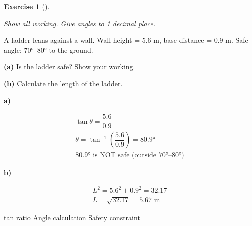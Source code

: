\documentclass[
  letterpaper,
  DIV=11,
  numbers=noendperiod]{scrreprt}
\theoremstyle{definition}
\newtheorem{exercise}{Exercise}[chapter]
\theoremstyle{remark}
\begin{document}
\begin{exercise}[]\protect\hypertarget{exr-trig-24}{}\label{exr-trig-24}

\emph{Show all working. Give angles to 1 decimal place.}

A ladder leans against a wall. Wall height = 5.6 m, base distance = 0.9
m. Safe angle: 70°--80° to the ground.

\textbf{(a)} Is the ladder safe? Show your working.

\textbf{(b)} Calculate the length of the ladder.

\begin{tcolorbox}[enhanced jigsaw, opacitybacktitle=0.6, coltitle=black, arc=.35mm, colframe=quarto-callout-tip-color-frame, colback=white, bottomrule=.15mm, left=2mm, colbacktitle=quarto-callout-tip-color!10!white, titlerule=0mm, opacityback=0, title=\textcolor{quarto-callout-tip-color}{\faLightbulb}\hspace{0.5em}{🔍 View Solution}, leftrule=.75mm, breakable, rightrule=.15mm, bottomtitle=1mm, toptitle=1mm, toprule=.15mm]

\textbf{a)}

\[
\begin{aligned}
\tan\theta = \dfrac{5.6}{0.9} \\ \theta = \tan^{-1}\!\left(\dfrac{5.6}{0.9}\right) = 80.9° \\ 80.9° \text{ is NOT safe (outside 70°–80°)}
\end{aligned}
\]

\textbf{b)}

\[
\begin{aligned}
L^2 = 5.6^2 + 0.9^2 = 32.17 \\ L = \sqrt{32.17} = 5.67 \text{ m}
\end{aligned}
\]

\end{tcolorbox}

{tan ratio} {Angle calculation} {Safety constraint}

\end{exercise}
\end{document}
